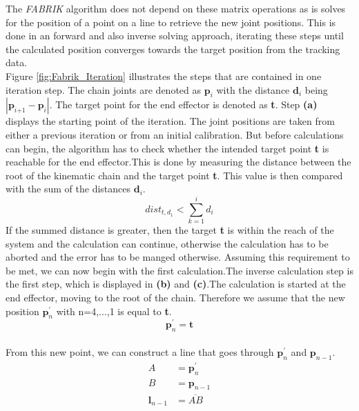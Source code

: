 The \textit{FABRIK} algorithm does not depend on these matrix operations as is solves for the position of a point on a line to retrieve the new joint positions. This is done in an forward and also inverse solving approach, iterating these steps until the calculated position converges towards the target position from the tracking data.
\\Figure \ref{fig:Fabrik_Iteration} illustrates the steps that are contained in one iteration step.
The chain joints are denoted as $\textbf{p}_{\textit{i}}$ with the distance $\textbf{d}_{i}$ being $|\textbf{p}_{\textit{i+1}}-\textbf{p}_{\textit{i}}|$. The target point for the end effector is denoted as \textbf{t}. Step \textbf{(a)} displays the starting point of the iteration. The joint positions are taken from either a previous iteration or from an initial calibration. 
But before calculations can begin, the algorithm has to check whether the intended target point \textbf{t} is reachable for the end effector.This is done by measuring the distance between the root of the kinematic chain and the target point \textbf{t}. This value is then compared with the sum of the distances $\textbf{d}_{i}$.
\begin{equation}
 dist_{t,d_{1}}< \sum_{k=1}^{i}{d_{i}}
\end{equation}
If the summed distance is greater, then the target \textbf{t} is within the reach of the system and the calculation can continue, otherwise the calculation has to be aborted and the error has to be manged otherwise.
Assuming this requirement to be met, we can now begin with the first calculation.The inverse calculation step is the first step, which is displayed in \textbf{(b)} and \textbf{(c)}.The calculation is started at the end effector, moving to the root of the chain.  Therefore we assume that the new position $\textbf{p}_{n}^{'}$ with n=4,...,1 is equal to \textbf{t}.\\
\begin{equation}
 \textbf{p}_{n}^{'}=\textbf{t}
\end{equation}
\\From this new point, we can construct a line that goes through $\textbf{p}_{n}^{'}$ and $\textbf{p}_{n-1}$.\\
\begin{equation}
\begin{split}
A&=\textbf{p}_{n}^{'}\\
B&=\textbf{p}_{n-1}\\
\textbf{l}_{n-1}&=\overline{AB}\\
\end{split}
\end{equation}
